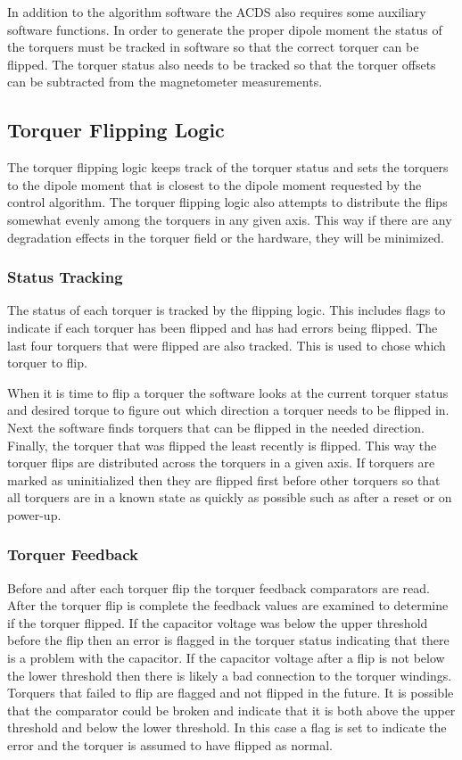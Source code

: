 In addition to the algorithm software the \ac{ACDS} also requires some auxiliary software functions. In order to generate the proper dipole moment the status of the torquers must be tracked in software so that the correct torquer can be flipped. The torquer status also needs to be tracked so that the torquer offsets can be subtracted from the magnetometer measurements. 

\subsection{Torquer Flipping Logic}

The torquer flipping logic keeps track of the torquer status and sets the torquers to the dipole moment that is closest to the dipole moment requested by the control algorithm. The torquer flipping logic also attempts to distribute the flips somewhat evenly among the torquers in any given axis. This way if there are any degradation effects in the torquer field or the hardware, they will be minimized. 

\subsubsection{Status Tracking}

The status of each torquer is tracked by the flipping logic. This includes flags to indicate if each torquer has been flipped and has had errors being flipped. The last four torquers that were flipped are also tracked. This is used to chose which torquer to flip.

When it is time to flip a torquer the software looks at the current torquer status and desired torque to figure out which direction a torquer needs to be flipped in. Next the software finds torquers that can be flipped in the needed direction. Finally, the torquer that was flipped the least recently is flipped. This way the torquer flips are distributed across the torquers in a given axis. If torquers are marked as uninitialized then they are flipped first before other torquers so that all torquers are in a known state as quickly as possible such as after a reset or on power-up.

\subsubsection{Torquer Feedback}

Before and after each torquer flip the torquer feedback comparators are read. After the torquer flip is complete the feedback values are examined to determine if the torquer flipped. If the capacitor voltage was below the upper threshold before the flip then an error is flagged in the torquer status indicating that there is a problem with the capacitor. If the capacitor voltage after a flip is not below the lower threshold then there is likely a bad connection to the torquer windings. Torquers that failed to flip are flagged and not flipped in the future. It is possible that the comparator could be broken and indicate that it is both above the upper threshold and below the lower threshold. In this case a flag is set to indicate the error and the torquer is assumed to have flipped as normal.

